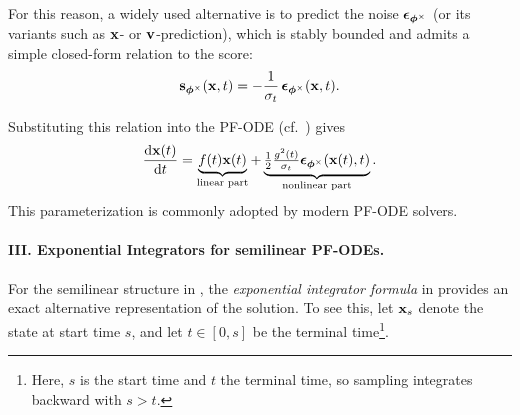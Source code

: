 For this reason, a widely used alternative is to predict the noise
${\bm{\epsilon}}_{\bm{\phi}^\times}$ (or its variants such as ${\mathbf{x}}$- or ${\mathbf{v}}$-prediction),
which is stably bounded and admits a simple closed-form relation to the score:
\[
{\mathbf{s}}_{\bm{\phi}^\times}({\mathbf{x}},t) = -\frac{1}{\sigma_t}\,{\bm{\epsilon}}_{\bm{\phi}^\times}({\mathbf{x}},t).
\]



Substituting this relation into the PF-ODE (cf.\ ) gives
\begin{equation}\label{eq:noise_pf_ode}
\frac{\mathop{}\!\mathrm{d}{\mathbf{x}}(t)}{\mathop{}\!\mathrm{d} t}
 = 
\underbrace{f(t) {\mathbf{x}}(t)}_{\text{linear part}}
 + 
\underbrace{\tfrac{1}{2} \tfrac{g^2(t)}{\sigma_t} {\bm{\epsilon}}_{\bm{\phi}^\times}({\mathbf{x}}(t), t)}_{\text{nonlinear part}}.
\end{equation}
This parameterization is commonly adopted by modern PF-ODE solvers.

\paragraph{III. Exponential Integrators for semilinear PF-ODEs.} 
For the semilinear structure in , the \emph{exponential integrator formula} in  provides an exact alternative representation of the solution.
 To see this, let ${\mathbf{x}}_s$ denote the state at start time $s$, and let $t\in[0,s]$ be the terminal time\footnote{Here, $s$ is the start time and $t$ the terminal time, so sampling integrates backward with $s>t$.}. 
 
